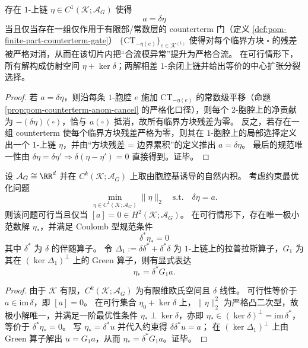\begin{theorem}\label{thm:pom-pw-counterterm-strictification-criterion}
存在 \(1\)-上链 \(\eta\in C^1(\mathcal K;\mathcal{A}_G)\) 使得
\[
\boxed{\;a=\delta\eta\;}
\]
当且仅当存在一组仅作用于有限部/常数层的 counterterm 门（定义 \ref{def:pom-finite-part-counterterm-gate}）
\(\{\mathrm{CT}_{-\eta(e)}\}_{e\in \mathcal K^{(1)}}\)
使得对每个临界方块 \(\square\) 的残差被严格对消，从而在该切片内把“合流模异常”提升为严格合流。
在可行情形下，所有解构成仿射空间 \(\eta+\ker\delta\)；两解相差 \(1\)-余闭上链并给出等价的中心扩张分裂选择。
\end{theorem}
\begin{proof}
若 \(a=\delta\eta\)，则沿每条 \(1\)-胞腔 \(e\) 施加 \(\mathrm{CT}_{-\eta(e)}\) 的常数级平移（命题 \ref{prop:pom-counterterm-anom-cancel} 的严格化口径），则每个 \(2\)-胞腔上的净贡献为 \(-(\delta\eta)(\square)\)，恰与 \(a(\square)\) 抵消，故所有临界方块残差为零。
反之，若存在一组 counterterm 使每个临界方块残差严格为零，则其在 \(1\)-胞腔上的局部选择定义出一个 \(1\)-上链 \(\eta\)，并由“方块残差 = 边界累积”的定义推出 \(a=\delta\eta\)。
最后的规范唯一性由 \(\delta\eta=\delta\eta'\Rightarrow \delta(\eta-\eta')=0\) 直接得到。证毕。
\end{proof}

\begin{theorem}\label{thm:pom-pw-minnorm-counterterm-hodge}
设 \(\mathcal{A}_G\cong\RR^d\) 并在 \(C^k(\mathcal K;\mathcal{A}_G)\) 上取由胞腔基诱导的自然内积。
考虑约束最优化问题
\[
\min_{\eta\in C^1(\mathcal K;\mathcal{A}_G)} \|\eta\|_2
\quad\text{s.t.}\quad \delta\eta=a.
\]
则该问题可行当且仅当 \([a]=0\in H^2(\mathcal K;\mathcal{A}_G)\)。
在可行情形下，存在唯一极小范数解 \(\eta_\ast\)，并满足 Coulomb 型规范条件
\[
\boxed{\;\delta^\ast \eta_\ast=0\;}
\]
其中 \(\delta^\ast\) 为 \(\delta\) 的伴随算子。
令 \(\Delta_1:=\delta\delta^\ast+\delta^\ast\delta\) 为 \(1\)-上链上的拉普拉斯算子，\(G_1\) 为其在 \((\ker\Delta_1)^\perp\) 上的 Green 算子，则有显式表达
\[
\boxed{\;\eta_\ast=\delta^\ast G_1 a.\;}
\]
\end{theorem}
\begin{proof}
由于 \(\mathcal K\) 有限，\(C^k(\mathcal K;\mathcal{A}_G)\) 为有限维欧氏空间且 \(\delta\) 线性。
可行性等价于 \(a\in\mathrm{im}\,\delta\)，即 \([a]=0\)。
在可行集合 \(\eta_0+\ker\delta\) 上，\(\|\eta\|_2^2\) 为严格凸二次型，故极小解唯一，并满足一阶最优性条件
\(
\eta_\ast\perp\ker\delta
\)，亦即 \(\eta_\ast\in(\ker\delta)^\perp=\mathrm{im}\,\delta^\ast\)，等价于 \(\delta^\ast\eta_\ast=0\)。
写 \(\eta_\ast=\delta^\ast u\) 并代入约束得 \(\delta\delta^\ast u=a\)；
在 \((\ker\Delta_1)^\perp\) 上由 Green 算子解出 \(u=G_1 a\)，从而 \(\eta_\ast=\delta^\ast G_1 a\)。证毕。
\end{proof}

